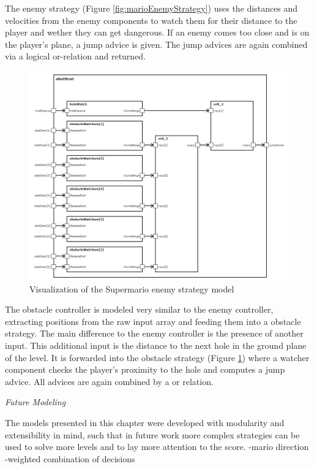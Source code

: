 The enemy strategy (Figure \ref{fig:marioEnemyStrategy}) uses the distances and velocities from the enemy components to watch them for their distance to the player and wether they can get dangerous. If an enemy comes too close and is on the player's plane, a jump advice is given. The jump advices are again combined via a logical or-relation and returned.

\begin{figure}
	\centering
	\includegraphics[scale=0.4]{pictures/haller_obstaclestrategy.PNG}
	\caption{Visualization of the Supermario enemy strategy model}
	\label{fig:marioObstacleStrategy}
\end{figure}

The obstacle controller is modeled very similar to the enemy controller, extracting positions from the raw input array and feeding them into a obstacle strategy. The main difference to the enemy controller is the presence of another input. This additional input is the distance to the next hole in the ground plane of the level. It is forwarded into the obstacle strategy (Figure \ref{fig:marioObstacleStrategy}) where a watcher component checks the player's proximity to the hole and computes a jump advice. All advices are again combined by a or relation.


\emph{Future Modeling}

The models presented in this chapter were developed with modularity and extensibility in mind, such that in future work more complex strategies can be used to solve more levels and to lay more attention to the score.
-mario direction
-weighted combination of decisions